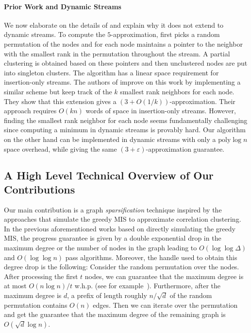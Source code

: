 \documentclass{theoretics}
\newcommand{\poly}{\mathrm{poly}}
\newcommand{\eps}{\ensuremath{\varepsilon}}
\begin{document}
\paragraph{Prior Work and Dynamic Streams}
We now elaborate on the details of \cite{behnezhad2023single,chakrabarty2023singlepass} and explain why it does not extend to dynamic streams.
To compute the $5$-approximation, \cite{behnezhad2023single} first picks a random permutation of the nodes and for each node maintains a pointer to the neighbor with the smallest rank in the permutation throughout the stream. A partial clustering is obtained based on these pointers and then unclustered nodes are put into singleton clusters. The algorithm has a linear space requirement for insertion-only streams.
The authors of \cite{chakrabarty2023singlepass} improve on this work by implementing a similar scheme but keep track of the $k$ smallest rank neighbors for each node. They show that this extension gives a $(3+O(1/k))$-approximation. Their approach requires $O(kn)$ words of space in insertion-only streams. However, finding the smallest rank neighbor for each node seems fundamentally challenging since computing a minimum in dynamic streams is provably hard. Our algorithm on the other hand can be implemented in dynamic streams with only a $\poly\log n$ space overhead, while giving the same $(3+\eps)$-approximation guarantee.



\subsection{A High Level Technical Overview of Our Contributions}

Our main contribution is a graph \emph{sparsification} technique inspired by the approaches that simulate the greedy MIS to approximate correlation clustering.
In the previous aforementioned works based on directly simulating the greedy MIS, the progress guarantee is given by a double exponential drop in the maximum degree or the number of nodes in the graph leading to $O(\log \log \Delta)$ and $O(\log \log n)$ pass algorithms.
Moreover, the handle used to obtain this degree drop is the following:
Consider the random permutation over the nodes.
After processing the first $t$ nodes, we can guarantee that the maximum degree is at most $O(n \log n)/t$ w.h.p. (see for example~\cite{ahn2015correlation}).
Furthermore, after the maximum degree is $d$, a prefix of length roughly $n/\sqrt{d}$ of the random permutation contains $O(n)$ edges. 
Then we can iterate over the permutation and get the guarantee that the maximum degree of the remaining graph is $O(\sqrt{d}\log n)$.
\end{document}
